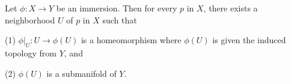 Let $\phi: X \to Y$ be an immersion. Then for every $p$ in $X$, there exists a neighborhood $U$ of $p$ in $X$ such that

(1) $\phi|_U: U \to \phi(U)$ is a homeomorphism where $\phi(U)$ is given the induced topology from $Y$, and

(2) $\phi(U)$ is a submanifold of $Y$.
